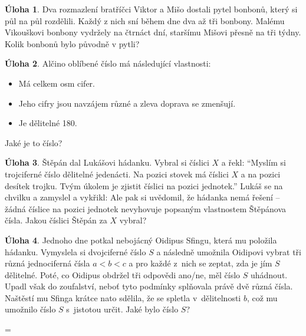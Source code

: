 \documentclass[12pt,a4paper]{article}
\theoremstyle{definition}
\newtheorem{uloha}{Úloha}
\def\vysld{}
\let\printvysl\relax
\let\vysl\vyslplain
\begin{document}
\begin{uloha}
Dva rozmazlení bratříčci Viktor a Mišo dostali pytel bonbonů, který si půl na půl rozdělili. Každý z nich sní během dne dva až tři bonbony. Malému Vikouškovi bonbony vydržely na čtrnáct dní, staršímu Mišovi přesně na tři týdny. Kolik bonbonů bylo původně v pytli?
\vysl{84}
\end{uloha}


\begin{uloha}
Alčino oblíbené číslo má následující vlastnosti:
\begin{itemize}
\item Má celkem osm cifer.
\item Jeho cifry jsou navzájem různé a zleva doprava se zmenšují.
\item Je dělitelné 180.
\end{itemize}
Jaké je to číslo?
\vysl{97654320}
\end{uloha}


\begin{uloha}
Štěpán dal Lukášovi hádanku. Vybral si číslici $X$ a řekl: "`Myslím si trojciferné číslo dělitelné jedenácti. Na pozici stovek má číslici $X$ a na pozici desítek trojku. Tvým úkolem je zjistit číslici na pozici jednotek."' Lukáš se na chvilku a zamyslel a vykřikl:  Ale pak si uvědomil, že hádanka nemá řešení -- žádná číslice na pozici jednotek nevyhovuje popsaným vlastnostem Štěpánova čísla. Jakou číslici Štěpán za $X$ vybral?
\vysl{4}
\end{uloha}


\begin{uloha}
Jednoho dne potkal nebojácný Oidipus Sfingu, která mu položila hádanku. Vymyslela si dvojciferné číslo $S$ a následně umožnila Oidipovi vybrat tři různá jednociferná čísla $a<b<c$ a pro každé z~nich se zeptat, zda je jím $S$ dělitelné. Poté, co Oidipus obdržel tři odpovědi ano/ne, měl číslo $S$ uhádnout. Upadl však do zoufalství, neboť tyto podmínky splňovala právě dvě různá čísla. Naštěstí mu Sfinga krátce nato sdělila, že se spletla v~dělitelnosti $b$, což mu umožnilo číslo $S$ s~jistotou určit. Jaké bylo číslo $S$?
\vysl{84}
\end{uloha}


\newpage
\parindent=0pt
\parskip=\smallskipamount
\def\printvysl#1#2{\textbf{#1.}\ #2\par}
\vysld
\end{document}

